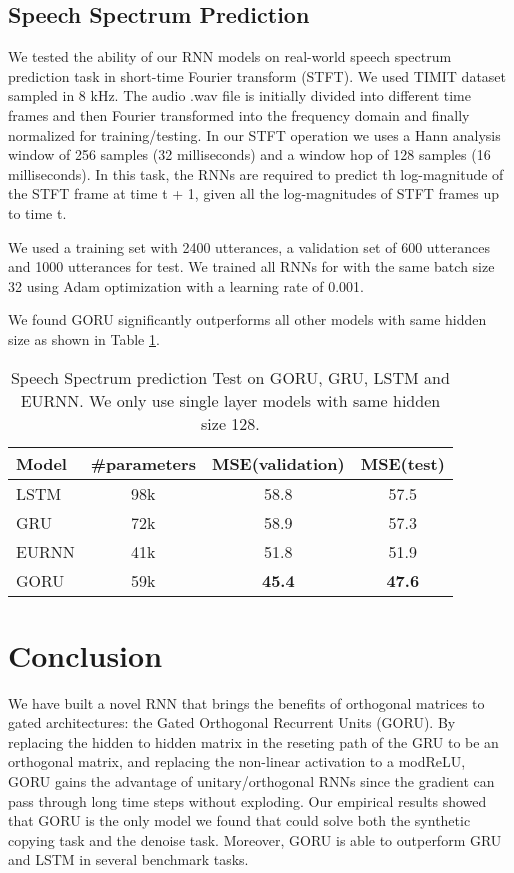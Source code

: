 \documentclass[letterpaper]{article} \usepackage{aaai18}  \usepackage{times}  \usepackage{helvet}  \usepackage{courier}  \usepackage{url}  \usepackage{graphicx}
\begin{document}
\subsection{Speech Spectrum Prediction}
We tested the ability of our RNN models on real-world speech spectrum prediction task in short-time Fourier transform (STFT)\cite{wisdom2016full,jing2016tunable}.
We used TIMIT dataset sampled in 8 kHz. The audio .wav file is initially divided into different time frames and then Fourier transformed into the frequency domain and finally normalized for training/testing. In our STFT operation we uses a Hann analysis window of 256 samples (32 milliseconds) and a window hop of 128 samples (16 milliseconds). In this task, the RNNs are required to predict th log-magnitude of the STFT frame at time t + 1, given all the log-magnitudes of STFT frames up to time t.

We used a training set with 2400 utterances, a validation set of 600 utterances and 1000 utterances for test. We trained all RNNs for with the same batch size 32 using Adam optimization with a learning rate of 0.001.

We found GORU significantly outperforms all other models with same hidden size as shown in Table \ref{tbl:timit}.

\begin{table}[h!]
\centering
\begin{tabular}{lccc}
\hline
Model       & \#parameters  & MSE(validation) &  MSE(test) \\
\hline
LSTM    & 98k & 58.8 & 57.5 \\
GRU      & 72k & 58.9 & 57.3  \\
EURNN   & 41k & 51.8 & 51.9 \\
GORU    & 59k & \textbf{45.4}  & \textbf{47.6}  \\
\hline
\end{tabular}
\caption{Speech Spectrum prediction Test on GORU, GRU, LSTM and EURNN. We only use single layer models with same hidden size 128.}
\label{tbl:timit}
\end{table}




\section{Conclusion}

  We have built a novel RNN that brings the benefits of orthogonal matrices to gated architectures: the Gated Orthogonal Recurrent Units (GORU). By replacing the hidden to hidden matrix in the reseting path of the GRU to be an orthogonal matrix, and replacing the non-linear activation to a modReLU, GORU gains the advantage of unitary/orthogonal RNNs since the gradient can pass through long time steps without exploding.
   Our empirical results showed that GORU is the only model we found that could solve both the synthetic copying task and the denoise task. Moreover, GORU is able to outperform GRU and LSTM in several benchmark tasks.  
   
\end{document}
